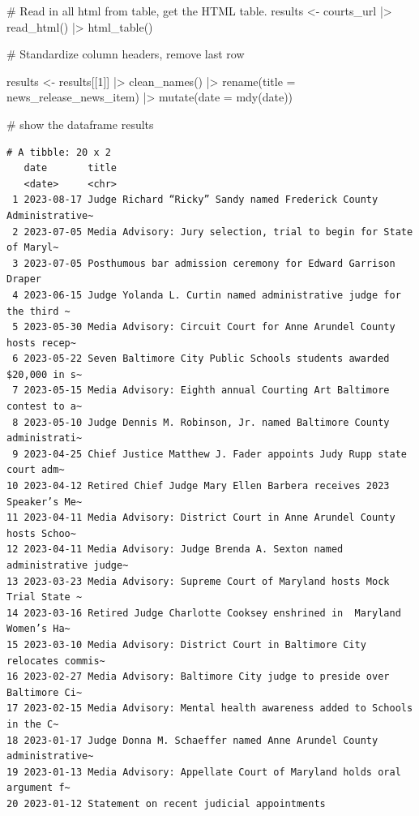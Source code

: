 \documentclass[
  letterpaper,
  DIV=11,
  numbers=noendperiod]{scrreprt}
\newenvironment{Shaded}{\begin{snugshade}}{\end{snugshade}}
\newcommand{\AttributeTok}[1]{\textcolor[rgb]{0.40,0.45,0.13}{#1}}
\newcommand{\CommentTok}[1]{\textcolor[rgb]{0.37,0.37,0.37}{#1}}
\newcommand{\DecValTok}[1]{\textcolor[rgb]{0.68,0.00,0.00}{#1}}
\newcommand{\FunctionTok}[1]{\textcolor[rgb]{0.28,0.35,0.67}{#1}}
\newcommand{\NormalTok}[1]{\textcolor[rgb]{0.00,0.23,0.31}{#1}}
\newcommand{\OtherTok}[1]{\textcolor[rgb]{0.00,0.23,0.31}{#1}}
\newcommand{\SpecialCharTok}[1]{\textcolor[rgb]{0.37,0.37,0.37}{#1}}
\begin{document}
\begin{Shaded}
\begin{Highlighting}[]
\CommentTok{\# Read in all html from table, get the HTML table.}
\NormalTok{results }\OtherTok{\textless{}{-}}\NormalTok{ courts\_url }\SpecialCharTok{|\textgreater{}}
  \FunctionTok{read\_html}\NormalTok{() }\SpecialCharTok{|\textgreater{}}
  \FunctionTok{html\_table}\NormalTok{()}

\CommentTok{\# Standardize column headers, remove last row}

\NormalTok{results }\OtherTok{\textless{}{-}}\NormalTok{ results[[}\DecValTok{1}\NormalTok{]] }\SpecialCharTok{|\textgreater{}}
  \FunctionTok{clean\_names}\NormalTok{() }\SpecialCharTok{|\textgreater{}}
  \FunctionTok{rename}\NormalTok{(}\AttributeTok{title =}\NormalTok{ news\_release\_news\_item) }\SpecialCharTok{|\textgreater{}}
  \FunctionTok{mutate}\NormalTok{(}\AttributeTok{date =} \FunctionTok{mdy}\NormalTok{(date))}

\CommentTok{\# show the dataframe}
\NormalTok{results}
\end{Highlighting}
\end{Shaded}

\begin{verbatim}
# A tibble: 20 x 2
   date       title                                                             
   <date>     <chr>                                                             
 1 2023-08-17 Judge Richard “Ricky” Sandy named Frederick County Administrative~
 2 2023-07-05 Media Advisory: Jury selection, trial to begin for State of Maryl~
 3 2023-07-05 Posthumous bar admission ceremony for Edward Garrison Draper      
 4 2023-06-15 Judge Yolanda L. Curtin named administrative judge for the third ~
 5 2023-05-30 Media Advisory: Circuit Court for Anne Arundel County hosts recep~
 6 2023-05-22 Seven Baltimore City Public Schools students awarded $20,000 in s~
 7 2023-05-15 Media Advisory: Eighth annual Courting Art Baltimore contest to a~
 8 2023-05-10 Judge Dennis M. Robinson, Jr. named Baltimore County administrati~
 9 2023-04-25 Chief Justice Matthew J. Fader appoints Judy Rupp state court adm~
10 2023-04-12 Retired Chief Judge Mary Ellen Barbera receives 2023 Speaker’s Me~
11 2023-04-11 Media Advisory: District Court in Anne Arundel County hosts Schoo~
12 2023-04-11 Media Advisory: Judge Brenda A. Sexton named administrative judge~
13 2023-03-23 Media Advisory: Supreme Court of Maryland hosts Mock Trial State ~
14 2023-03-16 Retired Judge Charlotte Cooksey enshrined in  Maryland Women’s Ha~
15 2023-03-10 Media Advisory: District Court in Baltimore City relocates commis~
16 2023-02-27 Media Advisory: Baltimore City judge to preside over Baltimore Ci~
17 2023-02-15 Media Advisory: Mental health awareness added to Schools in the C~
18 2023-01-17 Judge Donna M. Schaeffer named Anne Arundel County administrative~
19 2023-01-13 Media Advisory: Appellate Court of Maryland holds oral argument f~
20 2023-01-12 Statement on recent judicial appointments                         
\end{verbatim}
\end{document}
